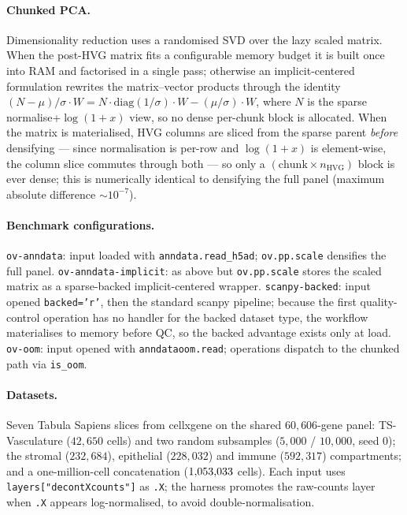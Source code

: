\documentclass[11pt]{article}
\begin{document}
\paragraph{Chunked PCA.} Dimensionality reduction uses a randomised
SVD\cite{halko2011randomsvd} over the lazy scaled matrix. When the post-HVG
matrix fits a configurable memory budget it is built once into RAM and
factorised in a single pass; otherwise an implicit-centered formulation
rewrites the matrix--vector products through the identity
$(N-\mu)/\sigma\cdot W = N\cdot\mathrm{diag}(1/\sigma)\cdot W -
(\mu/\sigma)\cdot W$, where $N$ is the sparse normalise+$\log(1{+}x)$ view,
so no dense per-chunk block is allocated. When the matrix is materialised,
HVG columns are sliced from the sparse parent \emph{before} densifying ---
since normalisation is per-row and $\log(1{+}x)$ is element-wise, the column
slice commutes through both --- so only a $(\mathrm{chunk}\times n_\mathrm{HVG})$
block is ever dense; this is numerically identical to densifying the full
panel (maximum absolute difference $\sim$$10^{-7}$).

\paragraph{Benchmark configurations.} \texttt{ov-anndata}: input loaded with
\texttt{anndata.read\_h5ad}; \texttt{ov.pp.scale} densifies the full panel.
\texttt{ov-anndata-implicit}: as above but \texttt{ov.pp.scale} stores the
scaled matrix as a sparse-backed implicit-centered wrapper.
\texttt{scanpy-backed}: input opened \texttt{backed='r'}, then the standard
scanpy pipeline; because the first quality-control operation has no handler
for the backed dataset type, the workflow materialises to memory before QC,
so the backed advantage exists only at load. \texttt{ov-oom}: input opened
with \texttt{anndataoom.read}; operations dispatch to the chunked path via
\texttt{is\_oom}.

\paragraph{Datasets.} Seven Tabula Sapiens slices\cite{tabulasapiens2022}
from cellxgene\cite{megill2021cellxgene} on the shared $60{,}606$-gene panel:
TS-Vasculature ($42{,}650$ cells) and two random subsamples ($5{,}000$ /
$10{,}000$, seed 0); the stromal ($232{,}684$), epithelial ($228{,}032$) and
immune ($592{,}317$) compartments; and a one-million-cell concatenation
($1{,}053{,}033$ cells). Each input uses \texttt{layers["decontXcounts"]} as
\texttt{.X}; the harness promotes the raw-counts layer when \texttt{.X}
appears log-normalised, to avoid double-normalisation.
\end{document}
